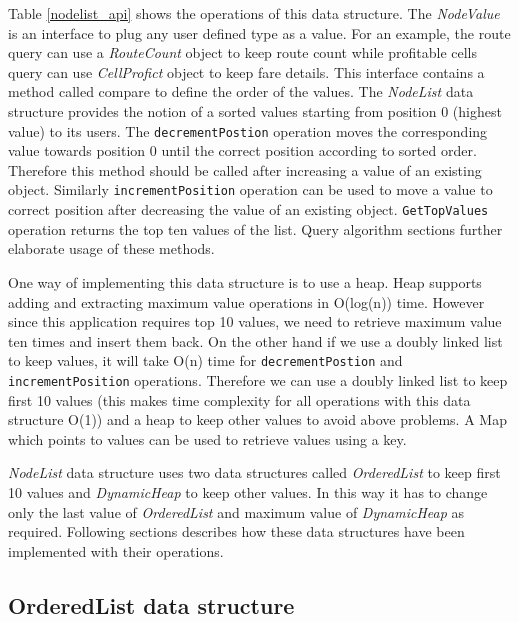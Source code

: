 Table \ref{nodelist_api} shows the operations of this data structure. The \textit{NodeValue} is an interface to plug any user defined type as a value. For an example, the route query can use a \textit{RouteCount} object to keep route count while profitable cells query can use \textit{CellProfict} object to keep fare details. This interface contains a method called compare to define the order of the values. The \textit{NodeList} data structure provides the notion of a sorted values starting from position 0 (highest value) to its users. The \texttt{decrementPostion} operation moves the corresponding value towards position 0 until the correct position according to sorted order. Therefore this method should be called after increasing a value of an existing object. Similarly \texttt{incrementPosition} operation can be used to move a value to correct position after decreasing the value of an existing object. \texttt{GetTopValues} operation returns the top ten values of the list. Query algorithm sections further elaborate usage of these methods.

One way of implementing this data structure is to use a heap. Heap supports adding and extracting maximum value operations in O(log(n)) time. However since this application requires top 10 values, we need to retrieve maximum value ten times and insert them back. On the other hand if we use a doubly linked list to keep values, it will take O(n) time for  \texttt{decrementPostion} and \texttt{incrementPosition} operations. Therefore we can use a doubly linked list to keep first 10 values (this makes time complexity for all operations with this data structure O(1)) and a heap to keep other values to avoid above problems.  A Map which points to values can be used to retrieve values using a key.

\textit{NodeList} data structure uses two data structures called \textit{OrderedList} to keep first 10 values and \textit{DynamicHeap} to keep other values. In this way it has to change only the last value of \textit{OrderedList} and maximum value of \textit{DynamicHeap} as required. Following sections describes how these data structures have been implemented with their operations.

\subsection{OrderedList data structure}

